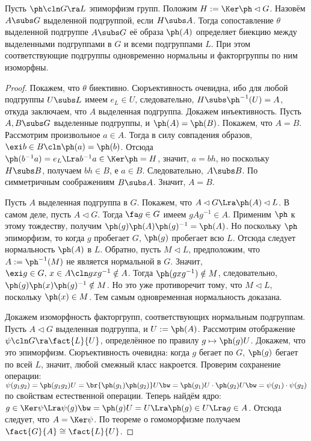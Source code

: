 \documentclass[a4paper]{article}
\newcommand{\kph}{\Ker \ph}
\begin{document}
\begin{theorem}[О соответствии]
Пусть $\ph\cln G \ra L$ эпиморфизм групп. Положим $H := \kph \lhd G$.  Назовём $A \subs G$ выделенной
подгруппой, если $H \subs A$. Тогда сопоставление $\theta$ выделенной подгруппе $A \subs G$ её образа
$\ph(A)$ определяет биекцию между выделенными подгруппами в $G$ и всеми подгруппами $L$. При этом
соответствующие подгруппы одновременно нормальны и факторгруппы по ним изоморфны.
\end{theorem}
\begin{proof}
 Покажем, что $\theta$ биективно. Сюръективность очевидна, ибо для  любой подгруппы $U \subs L$ имеем
$e_L \in U$, следовательно, $H \subs \ph^{-1}(U) = A$, откуда заключаем, что $A$ выделенная подгруппа.
Докажем инъективность. Пусть $A, B \subs G$ выделенные подгруппы, и $\ph(A)=\ph(B)$. Покажем, что $A=B$.
Рассмотрим произвольное $a \in A$. Тогда в силу совпадения образов, $\exi b \in B\cln \ph(a)=\ph(b)$. Отсюда
$\ph(b^{-1}a)=e_L \Lra b^{-1}a \in \kph =H$, значит, $a=bh$, но поскольку $H \subs B$, получаем $bh \in B$,
е $a \in B$. Следовательно, $A \subs B$. По симметричным соображениям $B \subs A$. Значит, $A=B$.

 Пусть $A$ выделенная подгруппа в $G$. Покажем, что  $A \lhd G \Lra \ph(A) \lhd L$. В самом деле,
пусть $A \lhd G$. Тогда $\fa g \in G$ имеем $gAg^{-1} \in A$. Применим $\ph$ к этому тождеству, получим
$\ph(g)\ph(A)\ph(g)^{-1}=\ph(A)$. Но поскольку $\ph$ эпиморфизм, то когда $g$ пробегает $G$, $\ph(g)$
пробегает всю $L$. Отсюда следует нормальность $\ph(A)$ в $L$. Обратно, пусть $M \lhd L$, предположим, что
$A := \ph^{-1}(M)$ не является нормальной в $G$. Значит, $\exi g \in G,\, x \in A\cln gxg^{-1} \notin A$. Тогда
$\ph(gxg^{-1}) \notin M$, следовательно, $\ph(g)\ph(x)\ph(g)^{-1} \notin M$. Но это уже противоречит тому,
что $M \lhd L$, поскольку $\ph(x) \in M$. Тем самым одновременная нормальность доказана.

 Докажем изоморфность факторгрупп, соответствующих нормальным  подгруппам. Пусть $A \lhd G$
выделенная подгруппа, и $U := \ph(A)$. Рассмотрим отображение $\psi\cln G \ra \fact{L}{U}$, определённое по
правилу $g \mapsto \ph(g)U$. Докажем, что это эпиморфизм. Сюръективность очевидна: когда $g$ бегает по $G$,
$\ph(g)$ бегает по всей $L$, значит, любой смежный класс накроется. Проверим сохранение операции:
$\psi(g_1g_2)=\ph(g_1g_2)U=\br{\ph(g_1)\ph(g_2)} U \bw= \ph(g_1)U \cdot \ph(g_2)U \bw= \psi(g_1) \cdot \psi(g_2)$ по
свойствам естественной операции. Теперь найдём ядро: $g \in \Ker \psi \Lra \psi(g) \bw= \ph(g)U=U \Lra \ph(g)
\in U \Lra g \in A$. Отсюда следует, что $A = \Ker \psi$. По теореме о гомоморфизме получаем $\fact{G}{A}
\cong \fact{L}{U}$.
\end{proof}
\end{document}
